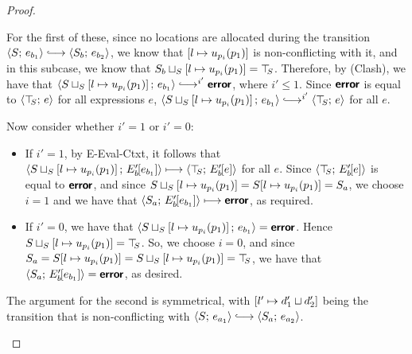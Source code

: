 \begin{proof}
\begin{enumerate}
\begin{enumerate}
\begin{itemize}
        For the first of these, since no locations are allocated
        during the transition $\config{S}{e_{b_1}} \parstepsto
        \config{S_b}{e_{b_2}}$, we know that
        $\left[ l \mapsto u_{p_i}(p_1) \right]$ is
        non-conflicting with it, and in this subcase, we know that
        $S_b \sqcup_{S} \left[ l \mapsto u_{p_i}(p_1) \right]
        = \top\hspace{-0.85mm}_{S}$.  Therefore, by (Clash),
        we have that
        $\config{\lubstore{S}{\store{\storebindingRaw{l}{u_{p_i}(p_1)}}}}{e_{b_1}}
        \parstepsto^{i'} \error$, where $i' \leq 1$.  Since $\textbf{\textsf{error}}$ is
        equal to $\langle \top\hspace{-0.85mm}_{S};\, e \rangle$ for all expressions $e$,
        $\config{\lubstore{S}{\store{\storebindingRaw{l}{u_{p_i}(p_1)}}}}{e_{b_1}}
        \parstepsto^{i'} \config{\topS}{e}$ for all $e$.

        Now consider whether $i' = 1$ or $i' = 0$:
        \begin{itemize}
          \item If $i' = 1$, by {\sc E-Eval-Ctxt}, it follows that
            $\langle S \sqcup_{S} \left[ l \mapsto u_{p_i}(p_1) \right];\, E'_b\hspace{-1mm}\left[e_{b_1}\right] \rangle
            \longmapsto \langle \top\hspace{-0.85mm}_{S};\, E'_b\hspace{-1mm}\left[e\right] \rangle$ for all
            $e$.  Since $\langle \top\hspace{-0.85mm}_{S};\, E'_b\hspace{-1mm}\left[e\right] \rangle$ is equal
            to $\textbf{\textsf{error}}$, and since
            $S \sqcup_{S} \left[ l \mapsto u_{p_i}(p_1) \right]
            = S[l \mapsto u_{p_i}(p_1)] = S_a$, we choose $i
            = 1$ and we have that
            $\langle S_a;\, E'_b\hspace{-1mm}\left[e_{b_1}\right] \rangle \longmapsto
            \textbf{\textsf{error}}$, as required.

          \item If $i' = 0$, we have that
            $\langle S \sqcup_{S} \left[ l \mapsto u_{p_i}(p_1) \right];\, e_{b_1} \rangle
            = \textbf{\textsf{error}}$.  Hence
            $S \sqcup_{S} \left[ l \mapsto u_{p_i}(p_1) \right]
            = \top\hspace{-0.85mm}_{S}$.  So, we choose $i = 0$, and since $S_a =
            S[l \mapsto u_{p_i}(p_1)] =
            S \sqcup_{S} \left[ l \mapsto u_{p_i}(p_1) \right]
            = \top\hspace{-0.85mm}_{S}$, we have that
            $\langle S_a;\, E'_b\hspace{-1mm}\left[e_{b_1}\right] \rangle = \textbf{\textsf{error}}$, as
            desired.
        \end{itemize}

        The argument for the second is symmetrical, with
        $\left[ l' \mapsto d'_1 \sqcup d'_2 \right]$ being the
        transition that is non-conflicting with $\config{S}{e_{a_1}}
        \parstepsto \config{S_a}{e_{a_2}}$.


\end{itemize}
\end{enumerate}
\end{enumerate}
\end{proof}
